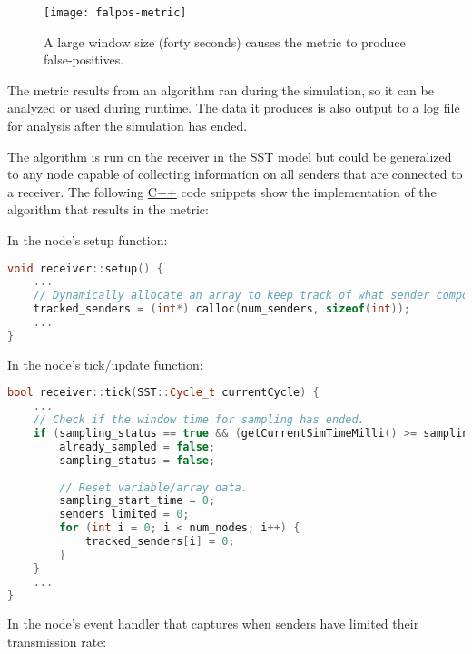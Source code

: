 \documentclass{article}
\begin{document}
\begin{figure}[H]
	\centering
	\texttt{[image: falpos-metric]}
	\caption{A large window size (forty seconds) causes the metric to produce false-positives.}
	\label{fig:falpos-metric}
\end{figure}

The metric results from an algorithm ran during the simulation, so it can be analyzed or used during runtime. The data it produces is also output to a log file for analysis after the simulation has ended.

The algorithm is run on the receiver in the SST model but could be generalized to any node capable of collecting information on all senders that are connected to a receiver. The following \href{https://en.wikipedia.org/wiki/C%2B%2B}{C++} code snippets show the implementation of the algorithm that results in the metric:\newline

\noindent In the node's setup function:
\begin{lstlisting}[language=C++, commentstyle=\fontfamily{fve}\selectfont\color{black}]
void receiver::setup() {
	...
	// Dynamically allocate an array to keep track of what sender components have limited transmission rates during a window of time.
	tracked_senders = (int*) calloc(num_senders, sizeof(int));
	...
}
\end{lstlisting}

\noindent In the node's tick/update function:

\begin{lstlisting}[language=C++, commentstyle=\fontfamily{fve}\selectfont\color{black}]
bool receiver::tick(SST::Cycle_t currentCycle) {
	...
	// Check if the window time for sampling has ended.
	if (sampling_status == true && (getCurrentSimTimeMilli() >= sampling_start_time + window_size)) {
		already_sampled = false;
		sampling_status = false;
		
		// Reset variable/array data. 
		sampling_start_time = 0;
		senders_limited = 0;
		for (int i = 0; i < num_nodes; i++) {
			tracked_senders[i] = 0;
		}
	}
	...
}
\end{lstlisting}
					
\noindent In the node's event handler that captures when senders have limited their transmission rate:
\end{document}
